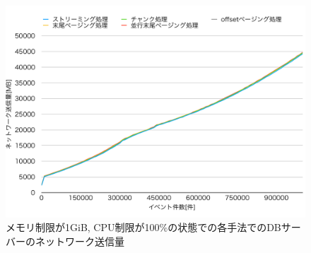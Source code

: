 \documentclass[../../../main]{subfiles}
\begin{document}
    \begin{figure}[H]
        \centering
        \includegraphics[width=12cm]{graph}
        \caption{メモリ制限が1GiB, CPU制限が100\%の状態での各手法でのDBサーバーのネットワーク送信量}
        \label{fig:db-net-out}
    \end{figure}
\end{document}
